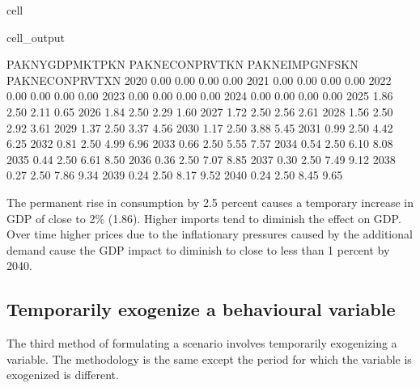 \documentclass[letterpaper,10pt,english]{jupyterBook}
\begin{document}
\begin{sphinxuseclass}{cell}
\begin{sphinxVerbatimOutput}
\begin{sphinxuseclass}{cell_output}
\begin{sphinxVerbatim}[commandchars=\\\{\}]
      PAKNYGDPMKTPKN  PAKNECONPRVTKN  PAKNEIMPGNFSKN  PAKNECONPRVTXN
2020            0.00            0.00            0.00            0.00
2021           \PYGZhy{}0.00            0.00           \PYGZhy{}0.00            0.00
2022           \PYGZhy{}0.00            0.00            0.00            0.00
2023            0.00            0.00            0.00            0.00
2024           \PYGZhy{}0.00            0.00            0.00            0.00
2025            1.86            2.50            2.11            0.65
2026            1.84            2.50            2.29            1.60
2027            1.72            2.50            2.56            2.61
2028            1.56            2.50            2.92            3.61
2029            1.37            2.50            3.37            4.56
2030            1.17            2.50            3.88            5.45
2031            0.99            2.50            4.42            6.25
2032            0.81            2.50            4.99            6.96
2033            0.66            2.50            5.55            7.57
2034            0.54            2.50            6.10            8.08
2035            0.44            2.50            6.61            8.50
2036            0.36            2.50            7.07            8.85
2037            0.30            2.50            7.49            9.12
2038            0.27            2.50            7.86            9.34
2039            0.24            2.50            8.17            9.52
2040            0.24            2.50            8.45            9.65
\end{sphinxVerbatim}

\end{sphinxuseclass}\end{sphinxVerbatimOutput}

\end{sphinxuseclass}
\sphinxAtStartPar
The permanent rise in consumption by 2.5 percent causes a temporary increase in GDP of close to 2\% (1.86). Higher imports tend to diminish the effect on GDP. Over time higher prices due to the inflationary pressures caused by the additional demand cause the GDP impact to diminish to close to less than 1 percent by 2040.


\subsection{Temporarily exogenize a behavioural variable}
\label{\detokenize{content/06_WBModels/ScenarioAnalysis:temporarily-exogenize-a-behavioural-variable}}
\sphinxAtStartPar
The third method of formulating a scenario involves temporarily exogenizing a variable. The methodology is the same except the period for which the variable is exogenized is different.
\end{document}
